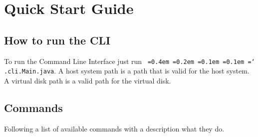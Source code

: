 \documentclass[a4paper,12pt]{article}
\newcommand*\justify{%
  \fontdimen2\font=0.4em%
  \fontdimen3\font=0.2em%
  \fontdimen4\font=0.1em%
  \fontdimen7\font=0.1em%
  \hyphenchar\font=`\-%
}
\newcommand{\mono}[1]{\texttt{\justify #1}}
\begin{document}

\section{Quick Start Guide}

\subsection{How to run the CLI}
To run the Command Line Interface just run \mono{.cli.Main.java}. A host system path is a path that is valid for the host system. A virtual disk path is a valid path for the virtual disk.

\subsection{Commands}
Following a list of available commands with a description what they do.
\end{document}
